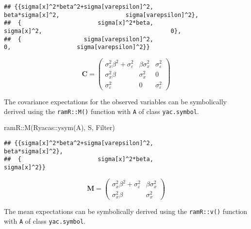 \documentclass[
]{book}
\newenvironment{Shaded}{\begin{snugshade}}{\end{snugshade}}
\newcommand{\FunctionTok}[1]{\textcolor[rgb]{0.00,0.00,0.00}{#1}}
\newcommand{\NormalTok}[1]{#1}
\newcommand{\SpecialCharTok}[1]{\textcolor[rgb]{0.00,0.00,0.00}{#1}}
\theoremstyle{definition}
\theoremstyle{definition}
\theoremstyle{definition}
\theoremstyle{remark}
\begin{document}
\begin{verbatim}
## {{sigma[x]^2*beta^2+sigma[varepsilon]^2,                       beta*sigma[x]^2,                   sigma[varepsilon]^2},
##  {                      sigma[x]^2*beta,                            sigma[x]^2,                                     0},
##  {                  sigma[varepsilon]^2,                                     0,                   sigma[varepsilon]^2}}
\end{verbatim}

\begin{equation*}\mathbf{C} =\left( \begin{array}{ccc} \sigma  _{x} ^{2} \beta  ^{2} + \sigma  _{\varepsilon } ^{2} & \beta  \sigma  _{x} ^{2} & \sigma  _{\varepsilon } ^{2} \\ \sigma  _{x} ^{2} \beta  & \sigma  _{x} ^{2} & 0 \\ \sigma  _{\varepsilon } ^{2} & 0 & \sigma  _{\varepsilon } ^{2} \end{array} \right)\end{equation*}

The covariance expectations for the observed variables
can be symbolically derived using the \texttt{ramR::M()} function
with \texttt{A} of class \texttt{yac.symbol}.

\begin{Shaded}
\begin{Highlighting}[]
\NormalTok{ramR}\SpecialCharTok{::}\FunctionTok{M}\NormalTok{(Ryacas}\SpecialCharTok{::}\FunctionTok{ysym}\NormalTok{(A), S, Filter)}
\end{Highlighting}
\end{Shaded}

\begin{verbatim}
## {{sigma[x]^2*beta^2+sigma[varepsilon]^2,                       beta*sigma[x]^2},
##  {                      sigma[x]^2*beta,                            sigma[x]^2}}
\end{verbatim}

\begin{equation*}\mathbf{M} =\left( \begin{array}{cc} \sigma  _{x} ^{2} \beta  ^{2} + \sigma  _{\varepsilon } ^{2} & \beta  \sigma  _{x} ^{2} \\ \sigma  _{x} ^{2} \beta  & \sigma  _{x} ^{2} \end{array} \right)\end{equation*}

The mean expectations
can be symbolically derived using the \texttt{ramR::v()} function
with \texttt{A} of class \texttt{yac.symbol}.
\end{document}
